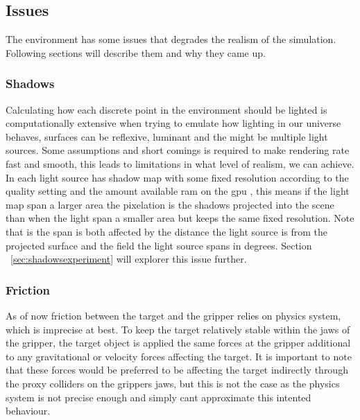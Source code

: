 

%

\subsection{Issues}

The environment has some issues that degrades the realism of the simulation. Following sections will describe them and why they came up.

\subsubsection{Shadows}

Calculating how each discrete point in the environment should be lighted is computationally extensive when trying to emulate how lighting in our universe behaves, surfaces can be reflexive, luminant and the might be multiple light sources. Some assumptions and short comings is required to make rendering rate fast and smooth, this leads to limitations in what level of realism, we can achieve. In \cite{unity3d} each light source has shadow map with some fixed resolution according to the quality setting and the amount available ram on the gpu \cite{unityshadowmapsize}, this means if the light map span a larger area the pixelation is the shadows projected into the scene than when the light span a smaller area but keeps the same fixed resolution. Note that is the span is both affected by the distance the light source is from the projected surface and the field the light source spans in degrees. Section ~\ref{sec:shadowsexperiment} will explorer this issue further.

\subsubsection{Friction}

As of now friction between the target and the gripper relies on \cite{unityphysics} physics system, which is imprecise at best. To keep the target relatively stable within the jaws of the gripper, the target object is applied the same forces at the gripper additional to any gravitational or velocity forces affecting the target. It is important to note that these forces would be preferred to be affecting the target indirectly through the proxy colliders on the grippers jaws, but this is not the case as the \cite{unity3d} physics system is not precise enough and simply cant approximate this intented behaviour.

